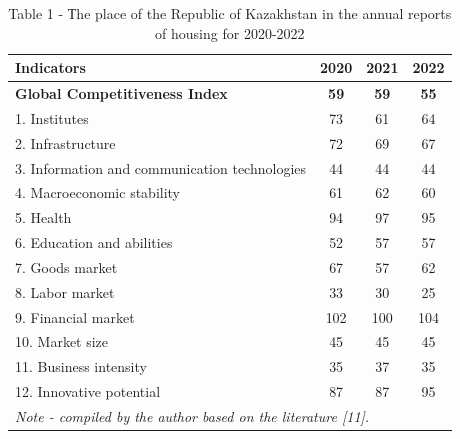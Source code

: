 \begin{table}[H]
\caption*{Table 1 - Тhe place of the Republic of Kazakhstan in the annual reports of housing for 2020-2022}
\centering
\begin{tabular}{|lccc|}
\hline
\multicolumn{1}{|l|}{\textbf{Indicators}}                           & \multicolumn{1}{c|}{\textbf{2020}} & \multicolumn{1}{c|}{\textbf{2021}} & \textbf{2022} \\ \hline
\multicolumn{1}{|l|}{\textbf{Global Competitiveness Index}}         & \multicolumn{1}{c|}{\textbf{59}}   & \multicolumn{1}{c|}{\textbf{59}}   & \textbf{55}   \\ \hline
\multicolumn{1}{|l|}{1. Institutes}              & \multicolumn{1}{c|}{73}  & \multicolumn{1}{c|}{61}  & 64  \\ \hline
\multicolumn{1}{|l|}{2. Infrastructure}          & \multicolumn{1}{c|}{72}  & \multicolumn{1}{c|}{69}  & 67  \\ \hline
\multicolumn{1}{|l|}{3. Information and communication technologies} & \multicolumn{1}{c|}{44}            & \multicolumn{1}{c|}{44}            & 44            \\ \hline
\multicolumn{1}{|l|}{4. Macroeconomic stability} & \multicolumn{1}{c|}{61}  & \multicolumn{1}{c|}{62}  & 60  \\ \hline
\multicolumn{1}{|l|}{5. Health}                  & \multicolumn{1}{c|}{94}  & \multicolumn{1}{c|}{97}  & 95  \\ \hline
\multicolumn{1}{|l|}{6. Education and abilities} & \multicolumn{1}{c|}{52}  & \multicolumn{1}{c|}{57}  & 57  \\ \hline
\multicolumn{1}{|l|}{7. Goods market}            & \multicolumn{1}{c|}{67}  & \multicolumn{1}{c|}{57}  & 62  \\ \hline
\multicolumn{1}{|l|}{8. Labor market}            & \multicolumn{1}{c|}{33}  & \multicolumn{1}{c|}{30}  & 25  \\ \hline
\multicolumn{1}{|l|}{9. Financial market}        & \multicolumn{1}{c|}{102} & \multicolumn{1}{c|}{100} & 104 \\ \hline
\multicolumn{1}{|l|}{10. Market size}            & \multicolumn{1}{c|}{45}  & \multicolumn{1}{c|}{45}  & 45  \\ \hline
\multicolumn{1}{|l|}{11. Business intensity}     & \multicolumn{1}{c|}{35}  & \multicolumn{1}{c|}{37}  & 35  \\ \hline
\multicolumn{1}{|l|}{12. Innovative potential}   & \multicolumn{1}{c|}{87}  & \multicolumn{1}{c|}{87}  & 95  \\ \hline
\multicolumn{4}{|l|}{\textit{Note - compiled by the author based on the literature {[}11{]}.}}               \\ \hline
\end{tabular}
\end{table}

